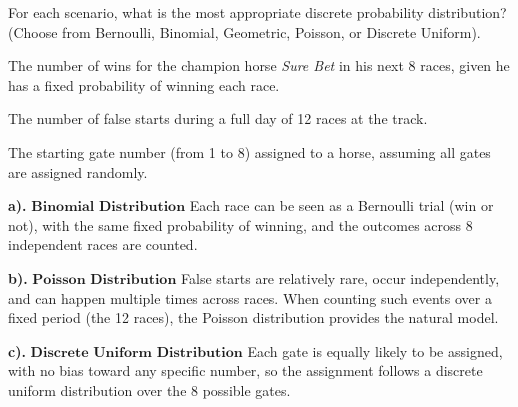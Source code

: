 \documentclass[a4paper, 10pt]{article}
\begin{document}
\begin{problem}
For each scenario, what is the most appropriate discrete probability distribution?
(Choose from Bernoulli, Binomial, Geometric, Poisson, or Discrete Uniform).
\begin{subproblems}
    \item The number of wins for the champion horse \textit{Sure Bet} in his next 8 races, given he has a fixed probability of winning each race.
    \item The number of false starts during a full day of 12 races at the track.
    \item The starting gate number (from 1 to 8) assigned to a horse, assuming all gates are assigned randomly.
\end{subproblems}
\end{problem}

\begin{solution}
\vspace{2mm}

\par\noindent\textbf{a).} \( \boxed{\textbf{Binomial Distribution}} \) Each race can be seen as a Bernoulli trial (win or not),
with the same fixed probability of winning, and the outcomes across 8 independent races are counted.

\vspace{2mm}

\par\noindent\textbf{b).} \( \boxed{\textbf{Poisson Distribution}} \) False starts are relatively rare, occur independently,
and can happen multiple times across races. When counting such events over a fixed period (the 12 races),
the Poisson distribution provides the natural model.

\vspace{2mm}

\par\noindent\textbf{c).} \( \boxed{\textbf{Discrete Uniform Distribution}} \) Each gate is equally likely to be assigned,
with no bias toward any specific number, so the assignment follows a discrete uniform distribution over the 8 possible gates.
\end{solution}
\end{document}
